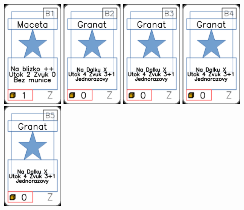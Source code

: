 \documentclass[a4paper]{article}
\begin{document}
	\includegraphics[width=3.0cm]{img-1_95}
	\includegraphics[width=3.0cm]{img-1_96}
	\includegraphics[width=3.0cm]{img-1_97}
	\includegraphics[width=3.0cm]{img-1_98}
	\includegraphics[width=3.0cm]{img-1_99}
\end{document}

